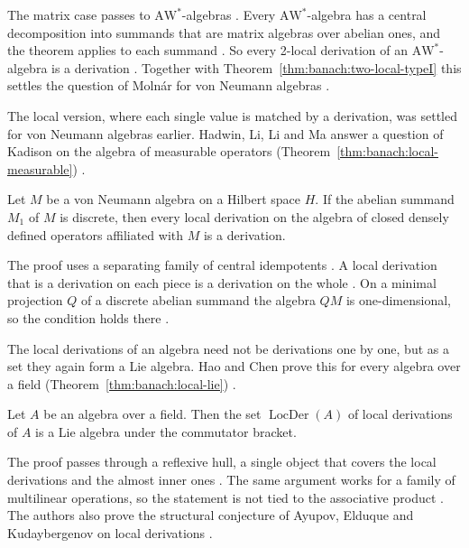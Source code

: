 The matrix case passes to $\mathrm{AW}^*$-algebras
\cite[p.~11]{AyupovKudaybergenov2014Matrix}. Every
$\mathrm{AW}^*$-algebra has a central decomposition into summands that are
matrix algebras over abelian ones, and the theorem applies to each summand
\cite[p.~11]{AyupovKudaybergenov2014Matrix}. So every 2-local derivation
of an $\mathrm{AW}^*$-algebra is a derivation
\cite[Theorem~3.1, p.~11]{AyupovKudaybergenov2014Matrix}. Together with
Theorem~\ref{thm:banach:two-local-typeI} this settles the question of
Moln\'ar for von Neumann algebras
\cite[p.~2]{AyupovKudaybergenov2014Matrix}.

The local version, where each single value is matched by a derivation, was
settled for von Neumann algebras earlier. Hadwin, Li, Li and Ma answer a
question of Kadison on the algebra of measurable operators (Theorem~\ref{thm:banach:local-measurable})
\cite[p.~1]{HadwinLiLiMa2013}.\begin{theorem}\label{thm:banach:local-measurable}
Let $M$ be a von Neumann algebra on a Hilbert space $H$. If the abelian
summand $M_1$ of $M$ is discrete, then every local derivation on the algebra
of closed densely defined operators affiliated with $M$ is a derivation.
\end{theorem}

The proof uses a separating family of central idempotents
\cite[Lemma~2, p.~2]{HadwinLiLiMa2013}. A local derivation that is a
derivation on each piece is a derivation on the whole
\cite[p.~2]{HadwinLiLiMa2013}. On a minimal projection $Q$ of a discrete
abelian summand the algebra $QM$ is one-dimensional, so the condition holds
there \cite[p.~3]{HadwinLiLiMa2013}.

The local derivations of an algebra need not be derivations one by one, but
as a set they again form a Lie algebra. Hao and Chen prove this for every
algebra over a field (Theorem~\ref{thm:banach:local-lie}) \cite[p.~1]{HaoChen2026Local}.

\begin{theorem}\label{thm:banach:local-lie}
Let $A$ be an algebra over a field. Then the set $\operatorname{LocDer}(A)$
of local derivations of $A$ is a Lie algebra under the commutator bracket.
\end{theorem}

The proof passes through a reflexive hull, a single object that covers the
local derivations and the almost inner ones \cite[p.~1]{HaoChen2026Local}. The
same argument works for a family of multilinear operations, so the statement
is not tied to the associative product \cite[p.~5]{HaoChen2026Local}. The
authors also prove the structural conjecture of Ayupov, Elduque and
Kudaybergenov on local derivations \cite[p.~1]{HaoChen2026Local}.

